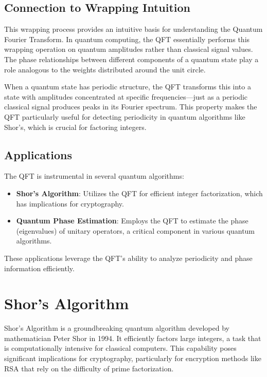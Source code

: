 \documentclass{article}
\begin{document}
\subsection{Connection to Wrapping Intuition}

This wrapping process provides an intuitive basis for understanding the Quantum Fourier Transform. In quantum computing, the QFT essentially performs this wrapping operation on quantum amplitudes rather than classical signal values. The phase relationships between different components of a quantum state play a role analogous to the weights distributed around the unit circle.

When a quantum state has periodic structure, the QFT transforms this into a state with amplitudes concentrated at specific frequencies—just as a periodic classical signal produces peaks in its Fourier spectrum. This property makes the QFT particularly useful for detecting periodicity in quantum algorithms like Shor's, which is crucial for factoring integers.

\subsection{Applications}

The QFT is instrumental in several quantum algorithms:

\begin{itemize}
    \item \textbf{Shor's Algorithm}: Utilizes the QFT for efficient integer factorization, which has implications for cryptography.
    \item \textbf{Quantum Phase Estimation}: Employs the QFT to estimate the phase (eigenvalues) of unitary operators, a critical component in various quantum algorithms.
\end{itemize}

These applications leverage the QFT's ability to analyze periodicity and phase information efficiently.

\section{Shor's Algorithm}

Shor's Algorithm is a groundbreaking quantum algorithm developed by mathematician Peter Shor in 1994. It efficiently factors large integers, a task that is computationally intensive for classical computers. This capability poses significant implications for cryptography, particularly for encryption methods like RSA that rely on the difficulty of prime factorization.
\end{document}
